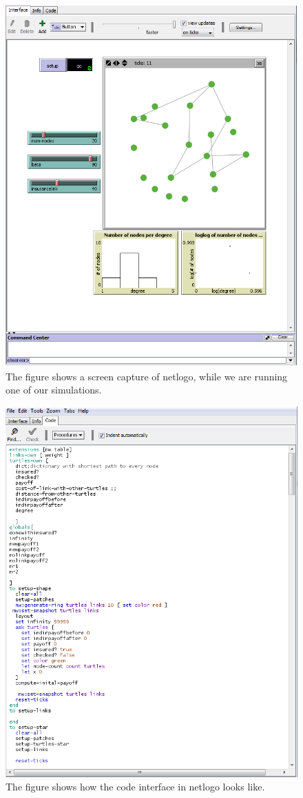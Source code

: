 \begin{figure}[h]
\centering
  \includegraphics[width=0.9\linewidth]{../Figures/netlogoexample.png}
  \caption{\label{fig:netlogo} The figure shows a screen capture of netlogo, while we are running one of our simulations.}

\end{figure}
\begin{figure}[h]
\centering
  \includegraphics[width=0.9\linewidth]{../Figures/netlogocodeexample.png}
  \caption{\label{fig:netlogo-code} The figure shows how the code interface in netlogo looks like.}

\end{figure}



